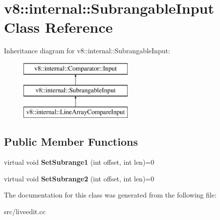\hypertarget{classv8_1_1internal_1_1_subrangable_input}{}\section{v8\+:\+:internal\+:\+:Subrangable\+Input Class Reference}
\label{classv8_1_1internal_1_1_subrangable_input}
Inheritance diagram for v8\+:\+:internal\+:\+:Subrangable\+Input\+:\begin{figure}[H]
\begin{center}
\leavevmode
\includegraphics[height=3.000000cm]{classv8_1_1internal_1_1_subrangable_input}
\end{center}
\end{figure}
\subsection*{Public Member Functions}
\begin{DoxyCompactItemize}
\item 
\hypertarget{classv8_1_1internal_1_1_subrangable_input_a9fec3e1dda77ea633776d5b574bb62a2}{}virtual void {\bfseries Set\+Subrange1} (int offset, int len)=0\label{classv8_1_1internal_1_1_subrangable_input_a9fec3e1dda77ea633776d5b574bb62a2}

\item 
\hypertarget{classv8_1_1internal_1_1_subrangable_input_ab092f639fde4aeb74efd697dc7dd18cf}{}virtual void {\bfseries Set\+Subrange2} (int offset, int len)=0\label{classv8_1_1internal_1_1_subrangable_input_ab092f639fde4aeb74efd697dc7dd18cf}

\end{DoxyCompactItemize}


The documentation for this class was generated from the following file\+:\begin{DoxyCompactItemize}
\item 
src/liveedit.\+cc\end{DoxyCompactItemize}

